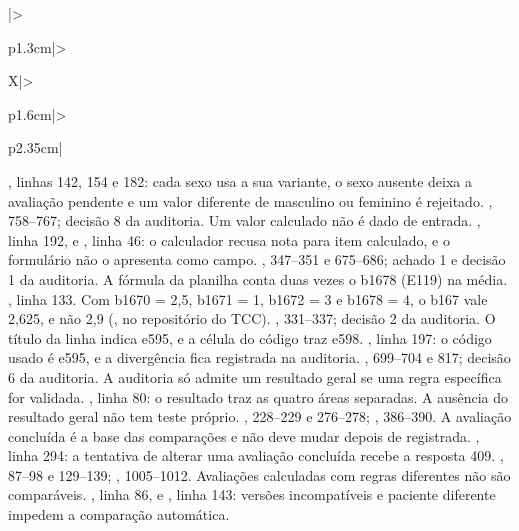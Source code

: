 \begin{apendicesenv}
{\begin{xltabular}{\textwidth}{|>{\raggedright\arraybackslash}p{1.3cm}|>{\raggedright\arraybackslash}X|>{\raggedright\arraybackslash}p{1.6cm}|>{\raggedright\arraybackslash}p{2.35cm}|}
		{, linhas 142, 154 e 182: cada sexo usa a sua variante, o sexo ausente deixa a
		avaliação pendente e um valor diferente de masculino ou feminino é rejeitado.}
		{, 758--767; decisão 8 da auditoria.}
		{Um valor calculado não é dado de entrada.}
		{, linha 192, e , linha 46: o calculador recusa nota
		para item calculado, e o formulário não o apresenta como campo.}
		{, 347--351 e 675--686; achado 1 e decisão 1 da auditoria.}
		{A fórmula da planilha conta duas vezes o b1678 (E119) na média.}
		{, linha 133. Com b1670 = 2,5, b1671 = 1, b1672 = 3 e b1678 = 4, o b167 vale 2,625,
		e não 2,9 (, no repositório do TCC).}
		{, 331--337; decisão 2 da auditoria.}
		{O título da linha indica e595, e a célula do código traz e598.}
		{, linha 197: o código usado é e595, e a divergência fica registrada na auditoria.}
		{, 699--704 e 817; decisão 6 da auditoria.}
		{A auditoria só admite um resultado geral se uma regra específica for validada.}
		{, linha 80: o resultado traz as quatro áreas separadas. A ausência do resultado geral
		não tem teste próprio.}
		{, 228--229 e 276--278; , 386--390.}
		{A avaliação concluída é a base das comparações e não deve mudar depois de registrada.}
		{, linha 294: a tentativa de alterar uma avaliação concluída recebe a resposta 409.}
		{, 87--98 e 129--139; , 1005--1012.}
		{Avaliações calculadas com regras diferentes não são comparáveis.}
		{, linha 86, e , linha 143: versões incompatíveis e
		paciente diferente impedem a comparação automática.}

\end{xltabular}}
\end{apendicesenv}
